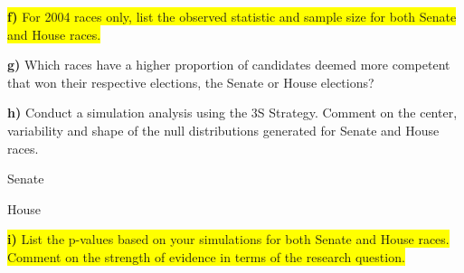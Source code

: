 \documentclass{article}
\newif\ifPrintSolution
\newcommand{\sol}[1]{\ifPrintSolution {\color{blue} #1 } \fi}
\begin{document}
\sol{$H_0: \pi = 0.5$\\
$H_a: \pi > 0.5$}


\vspace{.25in}

\hspace{0.1in} \colorbox{yellow}{\textbf{f) } For 2004 races only, list the observed statistic and sample size for both Senate and House races.}

\sol{$\hat{p}_{Senate} = \frac{22}{32} = 0.688; \; \; \; n_{Senate} = 32$\\
$\hat{p}_{House} = \frac{189}{279} = 0.677; \; \; \; n_{House} = 279$}

\vspace{0.25in}

\hspace{0.1in} \textbf{g) } Which races have a higher proportion of candidates deemed more competent that won their respective elections, the Senate or House elections?

\sol{The Senate elections had a higher proportion $(0.688 > 0.677)$}

\vspace{0.25in}

\hspace{0.1in} \textbf{h) } Conduct a simulation analysis using the 3S Strategy. Comment on the center, variability and shape of the null distributions generated for Senate and House races.

\vspace{0.1in} 
\hspace{0.2in}  Senate   \sol{The Senate is centered at 0.5 with values from 0.28 to 0.75, it is mound shaped and symmetric.} \\

\vspace{0.2in}

\hspace{0.2in} House   \sol{The House is centered at 0.5 with values from 0.39 to 0.60, it is mound shaped and symmetric} 

\vspace{0.25in}

\sol{\vspace{0.25in}}

\hspace{0.1in} \colorbox{yellow}{\textbf{i) } List the p-values based on your simulations for both Senate and House races.}\\ \colorbox{yellow}{Comment on the strength of evidence in terms of the research question.}
\end{document}
